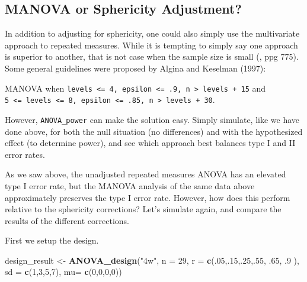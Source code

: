 \documentclass[
]{book}
\newenvironment{Shaded}{\begin{snugshade}}{\end{snugshade}}
\newcommand{\DataTypeTok}[1]{\textcolor[rgb]{0.13,0.29,0.53}{#1}}
\newcommand{\DecValTok}[1]{\textcolor[rgb]{0.00,0.00,0.81}{#1}}
\newcommand{\FloatTok}[1]{\textcolor[rgb]{0.00,0.00,0.81}{#1}}
\newcommand{\KeywordTok}[1]{\textcolor[rgb]{0.13,0.29,0.53}{\textbf{#1}}}
\newcommand{\NormalTok}[1]{#1}
\newcommand{\StringTok}[1]{\textcolor[rgb]{0.31,0.60,0.02}{#1}}
\begin{document}
\hypertarget{manova-or-sphericity-adjustment}{%
\subsection{MANOVA or Sphericity Adjustment?}\label{manova-or-sphericity-adjustment}}

In addition to adjusting for sphericity, one could also simply use the multivariate approach to repeated measures.
While it is tempting to simply say one approach is superior to another, that is not case when the sample size is small (\citet{maxwell_designing_2004}, ppg 775). Some general guidelines were proposed by Algina and Keselman (1997):

MANOVA when \texttt{levels\ \textless{}=\ 4,\ epsilon\ \textless{}=\ .9,\ n\ \textgreater{}\ levels\ +\ 15} and \texttt{5\ \textless{}=\ levels\ \textless{}=\ 8,\ epsilon\ \textless{}=\ .85,\ n\ \textgreater{}\ levels\ +\ 30}.

However, \texttt{ANOVA\_power} can make the solution easy. Simply simulate, like we have done above, for both the null situation (no differences) and with the hypothesized effect (to determine power), and see which approach best balances type I and II error rates.

As we saw above, the unadjusted repeated measures ANOVA has an elevated type I error rate, but the MANOVA analysis of the same data above approximately preserves the type I error rate. However, how does this perform relative to the sphericity corrections? Let's simulate again, and compare the results of the different corrections.

First we setup the design.

\begin{Shaded}
\begin{Highlighting}[]
\NormalTok{design_result <-}\StringTok{ }\KeywordTok{ANOVA_design}\NormalTok{(}\StringTok{"4w"}\NormalTok{,}
                              \DataTypeTok{n =} \DecValTok{29}\NormalTok{,}
                              \DataTypeTok{r =} \KeywordTok{c}\NormalTok{(.}\DecValTok{05}\NormalTok{,.}\DecValTok{15}\NormalTok{,.}\DecValTok{25}\NormalTok{,.}\DecValTok{55}\NormalTok{, }\FloatTok{.65}\NormalTok{, }\FloatTok{.9}
\NormalTok{                              ),}
                              \DataTypeTok{sd =} \KeywordTok{c}\NormalTok{(}\DecValTok{1}\NormalTok{,}\DecValTok{3}\NormalTok{,}\DecValTok{5}\NormalTok{,}\DecValTok{7}\NormalTok{),}
                              \DataTypeTok{mu=} \KeywordTok{c}\NormalTok{(}\DecValTok{0}\NormalTok{,}\DecValTok{0}\NormalTok{,}\DecValTok{0}\NormalTok{,}\DecValTok{0}\NormalTok{))}
\end{Highlighting}
\end{Shaded}
\end{document}

